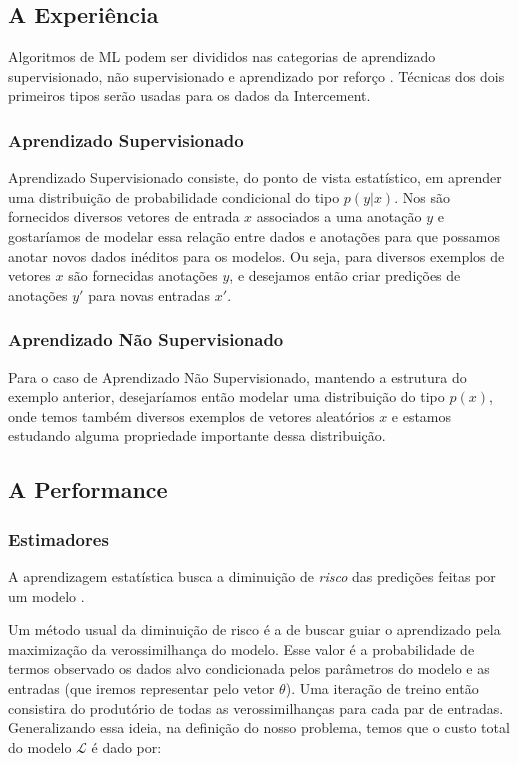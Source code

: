 \subsection{A Experiência}
\label{sec:exp}
Algoritmos de ML podem ser divididos nas categorias de aprendizado supervisionado, não supervisionado e aprendizado por reforço \citep{dlbook}. Técnicas dos dois primeiros tipos serão usadas para os dados da Intercement.


\subsubsection{Aprendizado Supervisionado}
\label{sec:apren} 
Aprendizado Supervisionado consiste, do ponto de vista estatístico, em aprender uma distribuição
de probabilidade condicional do tipo $p(y | x)$. Nos são fornecidos diversos vetores de
entrada $x$ associados a uma anotação $y$ e gostaríamos de modelar essa relação
entre dados e anotações para que possamos anotar novos dados inéditos para os
modelos. Ou seja, para diversos exemplos de vetores
$x$ são fornecidas anotações $y$, e desejamos então criar predições de anotações
$y'$ para novas entradas $x'$.


\subsubsection{Aprendizado Não Supervisionado}

Para o caso de Aprendizado Não Supervisionado, mantendo a estrutura do exemplo
anterior, desejaríamos então modelar uma distribuição do tipo $p(x)$, onde temos
também diversos exemplos de vetores aleatórios $x$ e estamos estudando alguma propriedade importante dessa distribuição.



\subsection{A Performance}
\label{sec:metricas}

\subsubsection{Estimadores}
\label{sec:est}

A aprendizagem estatística busca a diminuição de \textit{risco} das predições feitas por
um modelo \citep{mlprob}.

Um método usual da diminuição de risco é a de buscar guiar o aprendizado pela
maximização da verossimilhança do modelo. Esse valor é a probabilidade de termos
observado os dados alvo condicionada pelos parâmetros do modelo e as entradas
(que iremos representar pelo vetor $\theta$). Uma iteração de
treino então consistira do produtório de todas as verossimilhanças para cada par
de entradas. Generalizando essa ideia, na definição do nosso problema, temos que o custo total do modelo
$\mathcal{L}$ é dado por:

